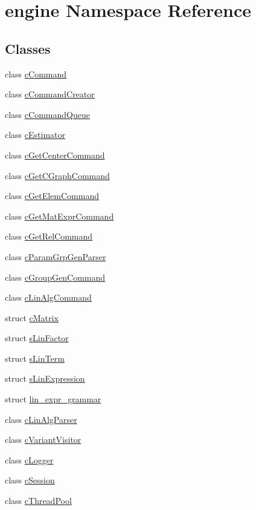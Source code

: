 \hypertarget{namespaceengine}{\section{engine Namespace Reference}
\label{namespaceengine}
}
\subsection*{Classes}
\begin{DoxyCompactItemize}
\item 
class \hyperlink{classengine_1_1cCommand}{c\-Command}
\item 
class \hyperlink{classengine_1_1cCommandCreator}{c\-Command\-Creator}
\item 
class \hyperlink{classengine_1_1cCommandQueue}{c\-Command\-Queue}
\item 
class \hyperlink{classengine_1_1cEstimator}{c\-Estimator}
\item 
class \hyperlink{classengine_1_1cGetCenterCommand}{c\-Get\-Center\-Command}
\item 
class \hyperlink{classengine_1_1cGetCGraphCommand}{c\-Get\-C\-Graph\-Command}
\item 
class \hyperlink{classengine_1_1cGetElemCommand}{c\-Get\-Elem\-Command}
\item 
class \hyperlink{classengine_1_1cGetMatExprCommand}{c\-Get\-Mat\-Expr\-Command}
\item 
class \hyperlink{classengine_1_1cGetRelCommand}{c\-Get\-Rel\-Command}
\item 
class \hyperlink{classengine_1_1cParamGrpGenParser}{c\-Param\-Grp\-Gen\-Parser}
\item 
class \hyperlink{classengine_1_1cGroupGenCommand}{c\-Group\-Gen\-Command}
\item 
class \hyperlink{classengine_1_1cLinAlgCommand}{c\-Lin\-Alg\-Command}
\item 
struct \hyperlink{structengine_1_1cMatrix}{c\-Matrix}
\item 
struct \hyperlink{structengine_1_1sLinFactor}{s\-Lin\-Factor}
\item 
struct \hyperlink{structengine_1_1sLinTerm}{s\-Lin\-Term}
\item 
struct \hyperlink{structengine_1_1sLinExpression}{s\-Lin\-Expression}
\item 
struct \hyperlink{structengine_1_1lin__expr__grammar}{lin\-\_\-expr\-\_\-grammar}
\item 
class \hyperlink{classengine_1_1cLinAlgParser}{c\-Lin\-Alg\-Parser}
\item 
class \hyperlink{classengine_1_1cVariantVisitor}{c\-Variant\-Visitor}
\item 
class \hyperlink{classengine_1_1cLogger}{c\-Logger}
\item 
class \hyperlink{classengine_1_1cSession}{c\-Session}
\item 
class \hyperlink{classengine_1_1cThreadPool}{c\-Thread\-Pool}
\end{DoxyCompactItemize}
